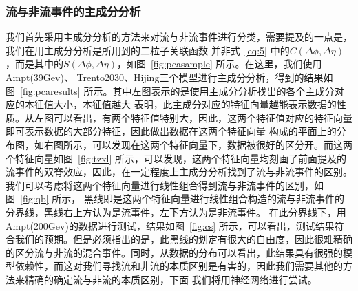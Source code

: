 \documentclass[aps,pre,12pt,preprint,onecolumn,showpacs,showkeys]{revtex4-1}
\begin{document}
\subsubsection{流与非流事件的主成分分析}
我们首先采用主成分分析的方法来对流与非流事件进行分类，需要提及的一点是，我们在用主成分分析是所用到的二粒子关联函数
并非式~\ref{eq:5} 中的$C(\Delta\phi,\Delta\eta)$，而是其中的$S(\Delta\phi,\Delta\eta)$，如图~\ref{fig:pcasample} 所示。在这里，我们使用Ampt(39Gev)、
Trento2030、Hijing三个模型进行主成分分析，得到的结果如图~\ref{fig:pcaresults} 所示。其中左图表示的是使用主成分分析找出的各个主成分对应的本征值大小，本征值越大
表明，此主成分对应的特征向量越能表示数据的性质。从左图可以看出，有两个特征值特别大，因此，这两个特征值对应的特征向量即可表示数据的大部分特征，因此做出数据在这两个特征向量
构成的平面上的分布图，如右图所示，可以发现在这两个特征向量下，数据被很好的区分开。而这两个特征向量如图~\ref{fig:tzxl} 所示，可以发现，这两个特征向量均刻画了前面提及的
流事件的双脊效应，因此，在一定程度上主成分分析找到了流与非流事件的区别。我们可以考虑将这两个特征向量进行线性组合得到流与非流事件的区别，如图~\ref{fig:qb} 所示，
黑线即是这两个特征向量进行线性组合构造的流与非流事件的分界线，黑线右上方认为是流事件，左下方认为是非流事件。
在此分界线下，用Ampt(200Gev)的数据进行测试，结果如图~\ref{fig:cs} 所示，可以看出，测试结果符合我们的预期。但是必须指出的是，此黑线的划定有很大的自由度，因此很难精确
的区分流与非流的混合事件。同时，从数据的分布可以看出，此结果具有很强的模型依赖性，而这对我们寻找流和非流的本质区别是有害的，因此我们需要其他的方法来精确的确定流与非流的本质区别，下面
我们将用神经网络进行尝试。
\end{document}
